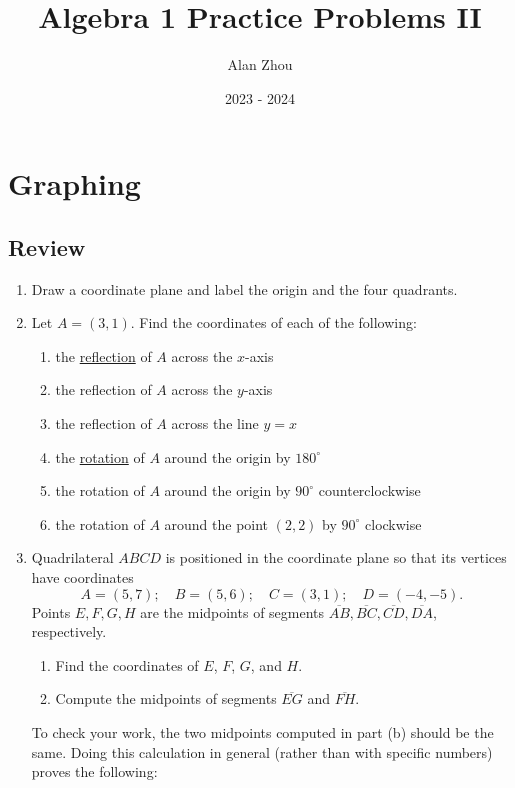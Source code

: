 \documentclass{article}
\title{Algebra 1 Practice Problems II}
\author{Alan Zhou}
\date{2023 - 2024}
\begin{document}
\maketitle
\tableofcontents


\newpage
\section{Graphing}

\subsection{Review}

\begin{enumerate}
\item Draw a coordinate plane and label the origin and the four quadrants.
\item Let $A = (3,1)$. Find the coordinates of each of the following:
\begin{enumerate}
\item the \href{https://en.wikipedia.org/wiki/Reflection_(mathematics)}{reflection} of $A$ across the $x$-axis
\item the reflection of $A$ across the $y$-axis
\item the reflection of $A$ across the line $y = x$
\item the \href{https://en.wikipedia.org/wiki/Rotation_(mathematics)}{rotation} of $A$ around the origin by $180^{\circ}$
\item the rotation of $A$ around the origin by $90^{\circ}$ counterclockwise
\item the rotation of $A$ around the point $(2,2)$ by $90^{\circ}$ clockwise
\end{enumerate}
\item Quadrilateral $ABCD$ is positioned in the coordinate plane so that its vertices have coordinates
\begin{equation*}
A = (5, 7);\quad B = (5, 6);\quad C = (3, 1);\quad D = (-4, -5).
\end{equation*}
Points $E, F, G, H$ are the midpoints of segments $\overline{AB}, \overline{BC}, \overline{CD}, \overline{DA}$, respectively.
\begin{enumerate}
\item Find the coordinates of $E$, $F$, $G$, and $H$.
\item Compute the midpoints of segments $\overline{EG}$ and $\overline{FH}$.
\end{enumerate}
To check your work, the two midpoints computed in part (b) should be the same. Doing this calculation in general (rather than with specific numbers) proves the following:

\end{enumerate}
\end{document}
